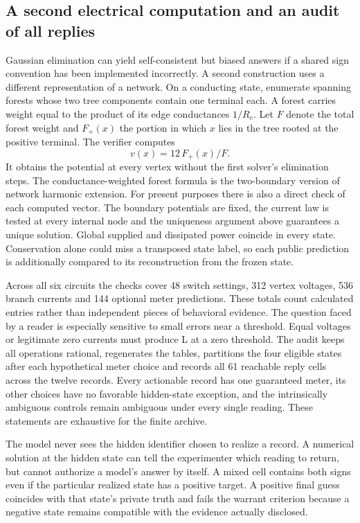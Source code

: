 \documentclass[12pt,letterpaper]{article}
\begin{document}
\subsection{A second electrical computation and an audit of all replies}

Gaussian elimination can yield self-consistent but biased answers if a shared sign convention has been implemented incorrectly. A second construction uses a different representation of a network. On a conducting state, enumerate spanning forests whose two tree components contain one terminal each. A forest carries weight equal to the product of its edge conductances $1/R_e$. Let $F$ denote the total forest weight and $F_+(x)$ the portion in which $x$ lies in the tree rooted at the positive terminal. The verifier computes
\[
                    v(x)=12\,F_+(x)/F .
\]
It obtains the potential at every vertex without the first solver's elimination steps. The conductance-weighted forest formula is the two-boundary version of network harmonic extension. For present purposes there is also a direct check of each computed vector. The boundary potentials are fixed, the current law is tested at every internal node and the uniqueness argument above guarantees a unique solution. Global supplied and dissipated power coincide in every state. Conservation alone could miss a transposed state label, so each public prediction is additionally compared to its reconstruction from the frozen state.

Across all six circuits the checks cover 48 switch settings, 312 vertex voltages, 536 branch currents and 144 optional meter predictions. These totals count calculated entries rather than independent pieces of behavioral evidence. The question faced by a reader is especially sensitive to small errors near a threshold. Equal voltages or legitimate zero currents must produce L at a zero threshold. The audit keeps all operations rational, regenerates the tables, partitions the four eligible states after each hypothetical meter choice and records all 61 reachable reply cells across the twelve records. Every actionable record has one guaranteed meter, its other choices have no favorable hidden-state exception, and the intrinsically ambiguous controls remain ambiguous under every single reading. These statements are exhaustive for the finite archive.

The model never sees the hidden identifier chosen to realize a record. A numerical solution at the hidden state can tell the experimenter which reading to return, but cannot authorize a model's answer by itself. A mixed cell contains both signs even if the particular realized state has a positive target. A positive final guess coincides with that state's private truth and fails the warrant criterion because a negative state remains compatible with the evidence actually disclosed.
\end{document}
